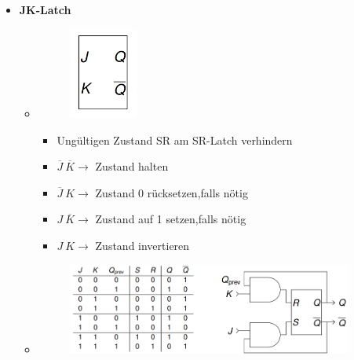 \documentclass[11pt,a4paper]{article}
\begin{document}
\begin{itemize}
\item \textbf{JK-Latch}
	\begin{itemize}
	\item[]		
				\begin{minipage}{0.25\textwidth}
					\begin{figure}[H]
					\includegraphics[height=3cm]{jklatch1}
					\end{figure}
				\end{minipage}
				\begin{minipage}[t]{0.6\textwidth}
					\vspace{-1.25cm}
					\begin{itemize}
					\item Ungültigen Zustand SR am SR-Latch verhindern
					\item $\overline{J}~\overline{K} \rightarrow$ Zustand halten
					\item $\overline{J}~K \rightarrow$ Zustand 0 rücksetzen,falls nötig
					\item $J~\overline{K} \rightarrow$ Zustand auf 1 setzen,falls nötig
					\item $J~K \rightarrow$ Zustand invertieren
					\end{itemize}
				\end{minipage}
				
	\item[] \begin{figure}[H]
				\begin{center}
				\includegraphics[height=3cm]{jklatch2}
				\end{center}
			\end{figure}
	\end{itemize}
	

\end{itemize}
\end{document}
